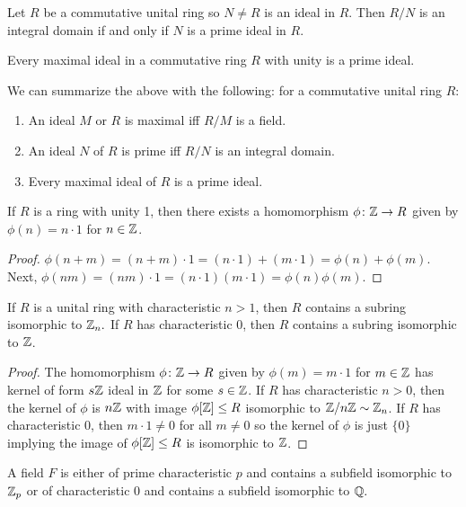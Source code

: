 \begin{theorem}
    Let $R$ be a commutative unital ring so $N \neq R$ is an ideal in $R$. Then $R/N$ is an integral domain if and only if $N$ is a prime ideal in $R.$
\end{theorem}
\begin{corollary}
    Every maximal ideal in a commutative ring $R$ with unity is a prime ideal.
\end{corollary}
\begin{remark}
    We can summarize the above with the following: for a commutative unital ring $R$: \begin{enumerate}
        \item An ideal $M$ or $R$ is maximal iff $R/M$ is a field.
        \item An ideal $N$ of $R$ is prime iff $R/N$ is an integral domain.
        \item Every maximal ideal of $R$ is a prime ideal.
    \end{enumerate}
\end{remark}
\begin{theorem}
    If $R$ is a ring with unity 1, then there exists a homomorphism $\phi\colon\mathbb{Z}\to R$ given by $\phi(n) = n\cdot1$ for $n \in \mathbb{Z}$.
\end{theorem}
\begin{proof}
    $\phi(n+m) = (n+m)\cdot1 = (n\cdot1)+(m\cdot1) = \phi(n)+\phi(m).$ Next, $\phi(nm) = (nm)\cdot1 = (n\cdot1)(m\cdot1)=\phi(n)\phi(m).$
\end{proof}
\begin{corollary}
    If $R$ is a unital ring with characteristic $n>1$, then $R$ contains a subring isomorphic to $\mathbb{Z}_n.$ If $R$ has characteristic 0, then $R$ contains a subring isomorphic to $\mathbb{Z}$.
\end{corollary}
\begin{proof}
    The homomorphism $\phi\colon\mathbb{Z}\to R$ given by $\phi(m) = m\cdot1$ for $m \in \mathbb{Z}$ has kernel of form $s\mathbb{Z}$ ideal in $\mathbb{Z}$ for some $s \in \mathbb{Z}$. If $R$ has characteristic $n>0$, then the kernel of $\phi$ is $n\mathbb{Z}$ with image $\phi[\mathbb{Z}]\leq R$ isomorphic to $\mathbb{Z}/n\mathbb{Z}\sim\mathbb{Z}_n$. If $R$ has characteristic 0, then $m\cdot1 \neq 0$ for all $m \neq 0$ so the kernel of $\phi$ is just $\{0\}$ implying the image of $\phi[\mathbb{Z}]\leq R$ is isomorphic to $\mathbb{Z}$.
\end{proof}
\begin{theorem}
    A field $F$ is either of prime characteristic $p$ and contains a subfield isomorphic to $\mathbb{Z}_p$ or of characteristic 0 and contains a subfield isomorphic to $\mathbb{Q}.$
\end{theorem}
